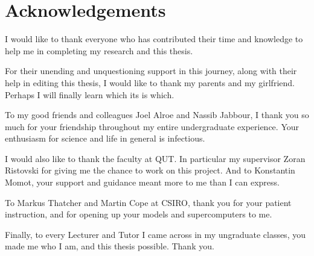 




\chapter*{Acknowledgements}
\label{ch:ackn}

I would like to thank everyone who has contributed their time and knowledge to help me in completing my research and this thesis.

For their unending and unquestioning support in this journey, along with their help in editing this thesis, I would like to thank my parents and my girlfriend. Perhaps I will finally learn which its is which.

To my good friends and colleagues Joel Alroe and Nassib Jabbour, I thank you so much for your friendship throughout my entire undergraduate experience. Your enthusiasm for science and life in general is infectious.

I would also like to thank the faculty at QUT. In particular my supervisor Zoran Ristovski for giving me the chance to work on this project. And to Konstantin Momot, your support and guidance meant more to me than I can express.

To Markus Thatcher and Martin Cope at CSIRO, thank you for your patient instruction, and for opening up your models and supercomputers to me. 

Finally, to every Lecturer and Tutor I came across in my ungraduate classes, you made me who I am, and this thesis possible. Thank you.